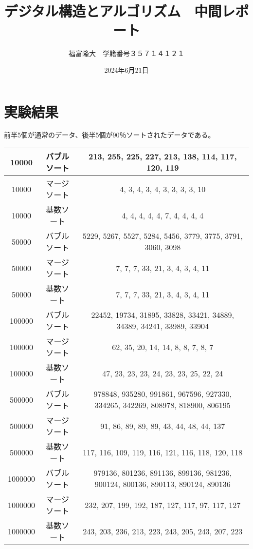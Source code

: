 \documentclass{jsarticle}
\title{デジタル構造とアルゴリズム　中間レポート}
\author{福富隆大　学籍番号３５７１４１２１}
\date{2024年6月21日}
\begin{document}
\maketitle
\section{実験結果}
前半5個が通常のデータ、後半5個が90％ソートされたデータである。\\
\begin{tabular}{|c|c|c|}\hline
    10000 & バブルソート & 213, 255, 225, 227, 213, 138, 114, 117, 120, 119 \\ \hline
    10000 & マージソート & 4, 3, 4, 3, 4, 3, 3, 3, 3, 10 \\ \hline
    10000 & 基数ソート   & 4, 4, 4, 4, 4, 7, 4, 4, 4, 4 \\ \hline
    50000 & バブルソート & 	5229, 5267, 5527, 5284, 5456, 3779, 3775, 3791, 3060, 3098 \\ \hline
    50000 & マージソート & 7, 7, 7, 33, 21, 3, 4, 3, 4, 11 \\ \hline
    50000 & 基数ソート   & 7, 7, 7, 33, 21, 3, 4, 3, 4, 11 \\ \hline
    100000 & バブルソート & 22452, 19734, 31895, 33828, 33421, 34889, 34389, 34241, 33989, 33904 \\ \hline
    100000 & マージソート & 62, 35, 20, 14, 14, 8, 8, 7, 8, 7 \\ \hline
    100000 & 基数ソート   & 47, 23, 23, 23, 24, 23, 23, 25, 22, 24 \\ \hline
    500000 & バブルソート & 978848, 935280, 991861, 967596, 927330, 334265, 342269, 808978, 818900, 806195 \\ \hline
    500000 & マージソート & 91, 86, 89, 89, 89, 43, 44, 48, 44, 137 \\ \hline
    500000 & 基数ソート   & 117, 116, 109, 119, 116, 121, 116, 118, 120, 118 \\ \hline
    1000000 & バブルソート & 979136, 801236, 891136, 899136, 981236, 900124, 800136, 890113, 890124, 890136 \\ \hline
    1000000 & マージソート & 232, 207, 199, 192, 187, 127, 117, 97, 117, 127 \\ \hline
    1000000 & 基数ソート   & 243, 203, 236, 213, 223, 243, 205, 243, 207, 223 \\ \hline
    \end{tabular}
\end{document}
